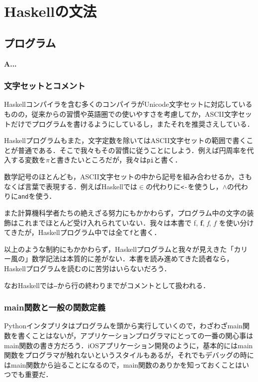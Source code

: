 \documentclass[a5paper,draft]{jsbook}
\newcommand{\programminglanguage}[1]{\textsf{#1}}
\newcommand{\haskell}{\programminglanguage{Haskell}}
\newcommand{\python}{\programminglanguage{Python}}
\newenvironment{leader}{\begingroup\bf}{\endgroup}
\newcommand{\code}[1]{\texttt{#1}}
\begin{document}
\part{\haskell の文法}

\chapter{プログラム}

\begin{leader}
A...
\end{leader}


\section{文字セットとコメント}

\haskell コンパイラを含む多くのコンパイラがUnicode文字セットに対応しているものの，従来からの習慣や英語圏での使いやすさを考慮してか，ASCII文字セットだけでプログラムを書けるようにしているし，またそれを推奨さえしている．

\haskell プログラムもまた，文字定数を除いてはASCII文字セットの範囲で書くことが普通である．そこで我々もその習慣に従うことにしよう．例えば円周率を代入する変数を$\pi$と書きたいところだが，我々は\code{pi}と書く．

数学記号のほとんども，ASCII文字セットの中から記号を組み合わせるか，さもなくば言葉で表現する．例えば\haskell では$\in$の代わりに\code{<-}を使うし，$\wedge$の代わりに\code{and}を使う．

また計算機科学者たちの絶えざる努力にもかかわらず，プログラム中の文字の装飾はこれまでほとんど受け入れられていない．我々は本書で \textrm{f}, \textbf{f}, \textit{f}, $f$ を使い分けてきたが，\haskell プログラム中では全て\code{f}と書く．

以上のような制約にもかかわらず，\haskell プログラムと我々が見えきた「カリー風の」数学記法は本質的に差がない．本書を読み進めてきた読者なら，\haskell プログラムを読むのに苦労はいらないだろう．

なお\haskell では\code{--}から行の終わりまでがコメントとして扱われる．

\section{main関数と一般の関数定義}

\python インタプリタはプログラムを頭から実行していくので，わざわざmain関数を書くことはないが，アプリケーションプログラマにとっての一番の関心事はmain関数の書き方だろう．iOSアプリケーション開発のように，基本的にはmain関数をプログラマが触れないというスタイルもあるが，それでもデバッグの時にはmain関数から辿ることになるので，main関数のありかを知っておくことはいつでも重要だ．
\end{document}
